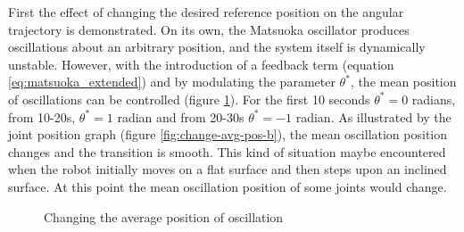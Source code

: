 \documentclass[12pt,twoside]{article}
\theoremstyle{plain}
\theoremstyle{definition}
\theoremstyle{remark}
\newcommand{\forceindent}{\leavevmode{\parindent=2em\indent}}
\begin{document}
\forceindent First the effect of changing the desired reference position on the angular trajectory is demonstrated. On its own, the Matsuoka oscillator produces oscillations about an arbitrary position, and the system itself is dynamically unstable. However, with the introduction of a feedback term (equation \ref{eq:matsuoka_extended}) and by modulating the parameter $\theta^*$, the mean position of oscillations can be controlled \cite{Ronsse2009} (figure \ref{fig:change-avg-pos}). For the first 10 seconds $\theta^*=0$ radians, from 10-20s, $\theta^*=1$ radian and from 20-30s $\theta^*=-1$ radian. As illustrated by the joint position graph (figure \ref{fig:change-avg-pos-b}), the mean oscillation position changes and the transition is smooth.  This kind of situation maybe encountered when the robot initially moves on a flat surface and then steps upon an inclined surface. At this point the mean oscillation position of some joints would change.

\begin{figure}[hbtp]
\centering     %
{}
\caption{Changing the average position of oscillation}
\label{fig:change-avg-pos}
\end{figure}
\end{document}
